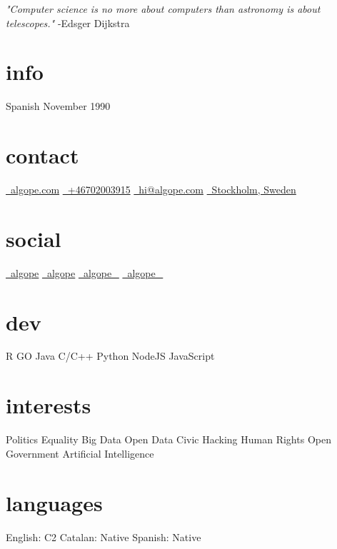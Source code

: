 \documentclass[]{cv}
\begin{document}
       {\emph{"Computer science is no more about computers than astronomy is about telescopes."} -Edsger Dijkstra}


\begin{aside}
	\section{info}
	Spanish
	November 1990
	~~~
    \section{contact}
        \href{http://algope.com}{\faGlobe\ algope.com}
        \href{https://t.me/algope}{\faPhone\ +46702003915}
        \href{mailto:hi@algope.com}{\faEnvelope\ hi@algope.com}
        \href{https://goo.gl/maps/Yx7t2KT2aJ52}{\faStreetView\ Stockholm, Sweden}
        ~~~
    \section{social}
        \href{https://www.linkedin.com/in/algope}{\faLinkedin\ algope} 
        \href{http://github.com/algope}{\faGithub\ algope}
        \href{http://twitter.com/algope_}{\faTwitter\ algope\_}
        \href{https://www.instagram.com/algope_}{\faInstagram\ algope\_}
        ~~~
    \section{dev}
        R
        GO
        Java
        C/C++
        Python
        NodeJS
        JavaScript
        ~~~
    \section{interests}
        Politics
        Equality
        Big Data
        Open Data
        Civic Hacking
        Human Rights
        Open Government
        Artificial Intelligence
        ~~~
     \section{languages}
        English: C2
        Catalan: Native
     	Spanish: Native
      	~~~
\end{aside}
\end{document}
